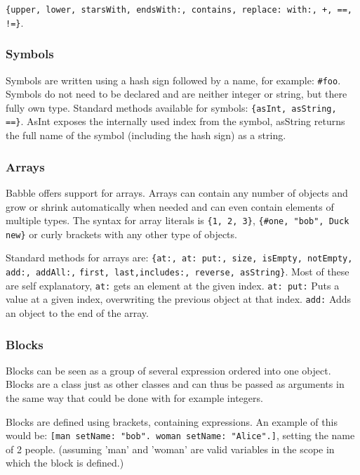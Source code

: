 \documentclass[a4paper]{article}
\begin{document}
\verb|{upper, lower, starsWith, endsWith:, contains, replace: with:, +, ==, !=}|.

\subsubsection{Symbols}

Symbols are written using a hash sign followed by a name, for example: \verb|#foo|. Symbols do not need to be declared and are neither integer or string, but there fully own type. Standard methods available for symbols:
\verb|{asInt, asString, ==}|. AsInt exposes the internally used index from the symbol, asString returns the full name of the symbol (including the hash sign) as a string.

\subsubsection{Arrays}

Babble offers support for arrays. Arrays can contain any number of objects and grow or shrink automatically when needed and can even contain elements of multiple types. The syntax for array literals is \verb|{1, 2, 3}|, \verb|{#one, "bob", Duck new}| or curly brackets with any other type of objects.

Standard methods for arrays are:
\verb|{at:, at: put:, size, isEmpty, notEmpty, add:, addAll:,|
\verb|first, last,includes:, reverse, asString}|. Most of these are self explanatory, \verb|at:| gets an element at the given index. \verb|at: put:| Puts a value at a given index, overwriting the previous object at that index. \verb|add:| Adds an object to the end of the array.


\subsubsection{Blocks}

Blocks can be seen as a group of several expression ordered into one object. Blocks are a class just as other classes and can thus be passed as arguments in the same way that could be done with for example integers.

Blocks are defined using brackets, containing expressions. An example of this would be:
\verb|[man setName: "bob". woman setName: "Alice".]|, setting the name of 2 people. (assuming 'man' and 'woman' are valid variables in the scope in which the block is defined.)
\end{document}
